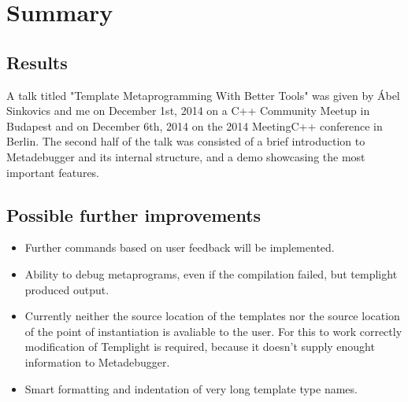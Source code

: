 
\chapter{Summary}

\section{Results}

A talk titled "Template Metaprogramming With Better Tools" was given by Ábel
Sinkovics and me on December 1st, 2014 on a C++ Community
Meetup\cite{cpp-meetup} in Budapest and on December 6th, 2014 on the
2014 MeetingC++\cite{meeting-cpp} conference in Berlin. The second half of the
talk was consisted of a brief introduction to Metadebugger and its internal
structure, and a demo showcasing the most important features.

\section{Possible further improvements}

\begin{itemize}
    \item
        Further commands based on user feedback will be implemented.
    \item
        Ability to debug metaprograms, even if the compilation failed, but
        templight produced output.
    \item
        Currently neither the source location of the templates nor the source
        location of the point of instantiation is avaliable to the user. For
        this to work correctly modification of Templight is required, because
        it doesn't supply enought information to Metadebugger.
    \item
        Smart formatting and indentation of very long template type names.
\end{itemize}
